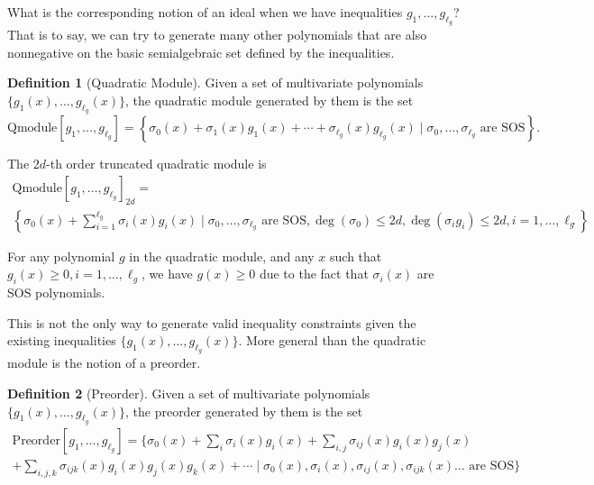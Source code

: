 \documentclass[
]{book}
\theoremstyle{definition}
\newtheorem{definition}{Definition}[chapter]
\theoremstyle{definition}
\theoremstyle{definition}
\theoremstyle{definition}
\theoremstyle{remark}
\begin{document}
What is the corresponding notion of an ideal when we have inequalities \(g_1,\dots,g_{\ell_g}\)? That is to say, we can try to generate many other polynomials that are also nonnegative on the basic semialgebraic set defined by the inequalities.

\begin{definition}[Quadratic Module]
\protect\hypertarget{def:QuadraticModule}{}\label{def:QuadraticModule}Given a set of multivariate polynomials \(\{ g_1(x),\dots,g_{\ell_g}(x) \}\), the quadratic module generated by them is the set
\[
\mathrm{Qmodule}[g_1,\dots,g_{\ell_g}] =  \left\{  \sigma_0(x) + \sigma_1(x)g_1(x) + \cdots + \sigma_{\ell_g}(x) g_{\ell_g}(x) \mid \sigma_0,\dots,\sigma_{\ell_g} \text{ are SOS}  \right\} .
\]

The \(2d\)-th order truncated quadratic module is
\begin{equation}
\begin{split}
\mathrm{Qmodule}[g_1,\dots,g_{\ell_g}]_{2d} = \\
 \left\{  \sigma_0(x) + \sum_{i=1}^{\ell_g} \sigma_i(x)g_i(x) \mid \sigma_0,\dots,\sigma_{\ell_g} \text{ are SOS}, \deg(\sigma_0) \leq 2d, \deg(\sigma_i g_i) \leq 2d,i=1,\dots,\ell_g \right\} .
\end{split}
\end{equation}
\end{definition}

For any polynomial \(g\) in the quadratic module, and any \(x\) such that \(g_i(x) \geq 0,i=1,\dots,\ell_g\), we have \(g(x) \geq 0\) due to the fact that \(\sigma_i(x)\) are SOS polynomials.

This is not the only way to generate valid inequality constraints given the existing inequalities \(\{ g_1(x),\dots,g_{\ell_g}(x) \}\). More general than the quadratic module is the notion of a preorder.

\begin{definition}[Preorder]
\protect\hypertarget{def:Preorder}{}\label{def:Preorder}Given a set of multivariate polynomials \(\{ g_1(x),\dots,g_{\ell_g}(x) \}\), the preorder generated by them is the set
\begin{equation}
\begin{split}
\mathrm{Preorder}[g_1,\dots,g_{\ell_g}] = \{ \sigma_0(x) + \sum_{i} \sigma_i(x) g_i(x) +  \sum_{i,j} \sigma_{ij}(x) g_i(x) g_j(x) \\
 + \sum_{i,j,k} \sigma_{ijk}(x) g_i(x) g_j(x) g_k(x) + \cdots \mid \sigma_0(x),\sigma_i(x),\sigma_{ij}(x),\sigma_{ijk}(x)\dots \text{ are SOS} \}
\end{split}
\end{equation}
\end{definition}
\end{document}
